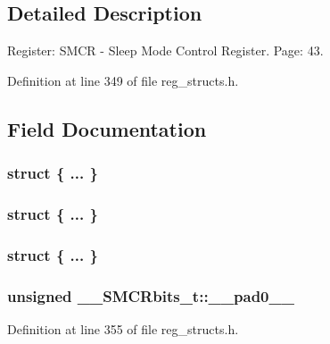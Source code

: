 \subsection{Detailed Description}
Register\+: S\+M\+C\+R -\/ Sleep Mode Control Register. Page\+: 43. 

Definition at line 349 of file reg\+\_\+structs.\+h.



\subsection{Field Documentation}
\hypertarget{union_____s_m_c_rbits__t_aa1e2539cdf60e73f6ac356e3a654868e}{\subsubsection[{"@83}]{\setlength{\rightskip}{0pt plus 5cm}struct \{ ... \} }}\label{union_____s_m_c_rbits__t_aa1e2539cdf60e73f6ac356e3a654868e}
\hypertarget{union_____s_m_c_rbits__t_abab800dedb6949db1bd8010951f93d57}{\subsubsection[{"@85}]{\setlength{\rightskip}{0pt plus 5cm}struct \{ ... \} }}\label{union_____s_m_c_rbits__t_abab800dedb6949db1bd8010951f93d57}
\hypertarget{union_____s_m_c_rbits__t_af7a0d55caa0c84633c068fd6aad88429}{\subsubsection[{"@87}]{\setlength{\rightskip}{0pt plus 5cm}struct \{ ... \} }}\label{union_____s_m_c_rbits__t_af7a0d55caa0c84633c068fd6aad88429}
\hypertarget{union_____s_m_c_rbits__t_aa8bb506be2d939396e10e1c44ab30324}{
\subsubsection[{\+\_\+\+\_\+pad0\+\_\+\+\_\+}]{\setlength{\rightskip}{0pt plus 5cm}unsigned \+\_\+\+\_\+\+S\+M\+C\+Rbits\+\_\+t\+::\+\_\+\+\_\+pad0\+\_\+\+\_\+}}\label{union_____s_m_c_rbits__t_aa8bb506be2d939396e10e1c44ab30324}


Definition at line 355 of file reg\+\_\+structs.\+h.

